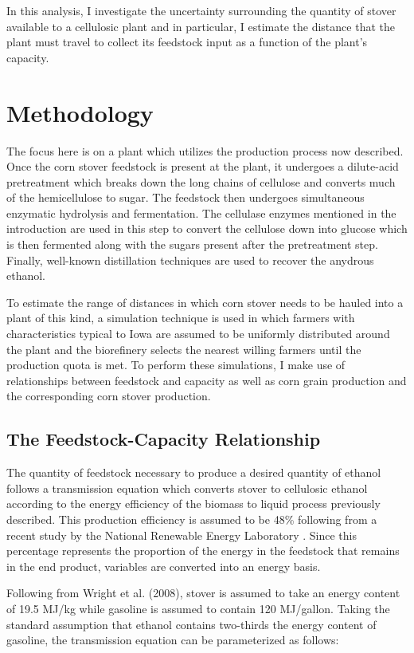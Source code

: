 \documentclass[12pt]{article}\usepackage[]{graphicx}\usepackage[]{color}
\begin{document}
In this analysis, I investigate the uncertainty surrounding the quantity of stover available to a cellulosic plant and in particular, I estimate the distance that the plant must travel to collect its feedstock input as a function of the plant's capacity.

\section{Methodology}

The focus here is on a plant which utilizes the production process now described.  Once the corn stover feedstock is present at the plant, it undergoes a dilute-acid pretreatment which breaks down the long chains of cellulose and converts much of the hemicellulose to sugar.  The feedstock then undergoes simultaneous enzymatic hydrolysis and fermentation.  The cellulase enzymes mentioned in the introduction are used in this step to convert the cellulose down into glucose which is then fermented along with the sugars present after the pretreatment step.  Finally, well-known distillation techniques are used to recover the anydrous ethanol.

To estimate the range of distances in which corn stover needs to be hauled into a plant of this kind, a simulation technique is used in which farmers with characteristics typical to Iowa are assumed to be uniformly distributed around the plant and the biorefinery selects the nearest willing farmers until the production quota is met.  To perform these simulations, I make use of relationships between feedstock and capacity as well as corn grain production and the corresponding corn stover production.

\subsection{The Feedstock-Capacity Relationship}

The quantity of feedstock necessary to produce a desired quantity of ethanol follows a transmission equation which converts stover to cellulosic ethanol according to the energy efficiency of the biomass to liquid process previously described.  This production efficiency is assumed to be 48\% following from a recent study by the National Renewable Energy Laboratory \cite{NREL}.  Since this percentage represents the proportion of the energy in the feedstock that remains in the end product, variables are converted into an energy basis.

Following from Wright et al. (2008), stover is assumed to take an energy content of 19.5 MJ/kg \cite{Wright et al} while gasoline is assumed to contain 120 MJ/gallon.  Taking the standard assumption that ethanol contains two-thirds the energy content of gasoline, the transmission equation can be parameterized as follows:
\end{document}
